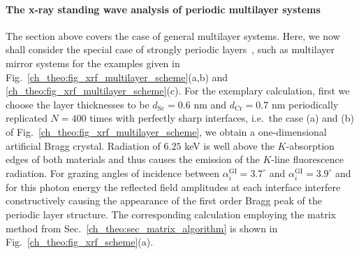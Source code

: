 \paragraph{The x-ray standing wave analysis of periodic multilayer systems}
The section above covers the case of general multilayer systems. Here, we now shall consider the special case of strongly periodic layers~\cite{dev_resonance_2000, ghose_x-ray_2001}, such as multilayer mirror systems for the examples given in Fig.~\ref{ch_theo:fig_xrf_multilayer_scheme}(a,b) and \ref{ch_theo:fig_xrf_multilayer_scheme}(c). For the exemplary calculation, first we choose the layer thicknesses to be $d_\text{Sc} = 0.6$ nm and $d_\text{Cr} = 0.7$ nm periodically replicated $N=400$ times with perfectly sharp interfaces, i.e.~the case (a) and (b) of Fig.~\ref{ch_theo:fig_xrf_multilayer_scheme}, we obtain a one-dimensional artificial Bragg crystal. Radiation of $6.25$ keV is well above the $K$-absorption edges of both materials and thus causes the emission of the $K$-line fluorescence radiation. For grazing angles of incidence between $\alpha_i^\text{GI} = 3.7^\circ$ and $\alpha_i^\text{GI}=3.9^\circ$ and for this photon energy the reflected field amplitudes at each interface interfere constructively causing the appearance of the first order Bragg peak of the periodic layer structure. The corresponding calculation employing the matrix method from Sec.~\ref{ch_theo:sec_matrix_algorithm} is shown in Fig.~\ref{ch_theo:fig_xrf_scheme}(a).

